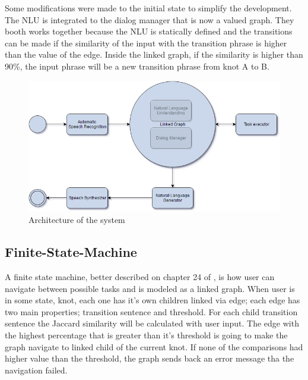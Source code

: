 \documentclass[
	article,			%
	11pt,				%
	oneside,			%
	a4paper,			%
	english,			%
	english,				%
	]{abntex2}
\begin{document}
Some modifications were made to the initial state to simplify the development. The NLU is integrated to
the dialog manager that is now a valued graph. They booth works together because the NLU is statically
defined and the transitions can be made if the similarity of the input with the transition phrase
is higher than the value of the edge. Inside the linked graph, if the similarity is higher than 90\%,
the input phrase will be a new transition phrase from knot A to B.

\begin{figure}[H]
    \caption[english]{Architecture of the system}
    \centering
    \includegraphics[width=\textwidth]{UsedArch}
\end{figure}

\subsection{Finite-State-Machine}

A finite state machine, better described on chapter 24 of \cite{speechlanguageprocessing}, is how user can navigate between possible tasks and is modeled as a linked graph. 
When user is in some state, knot, each one has it's own children linked via edge; each edge has two main 
properties; transition sentence and threshold. For each child transition sentence the Jaccard similarity
will be calculated with user input. The edge with the highest percentage that is greater than it's threshold
is going to make the graph navigate to linked child of the current knot. If none of the comparisons had
higher value than the threshold, the graph sends back an error message tha the navigation failed.
\end{document}
